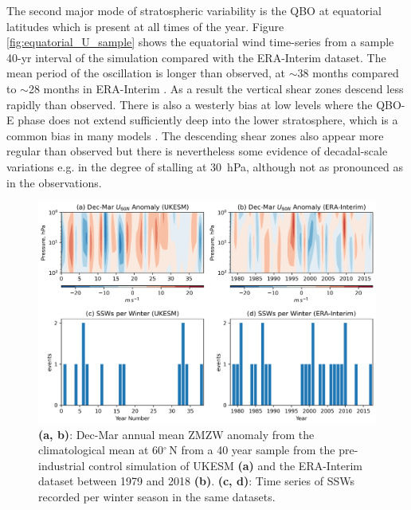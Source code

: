 The second major mode of stratospheric variability is the QBO at equatorial latitudes which is present at all times of the year. Figure \ref{fig:equatorial_U_sample} shows the equatorial wind time-series from a sample 40-yr interval of the simulation compared with the ERA-Interim dataset. The mean period of the oscillation is longer than observed, at $\sim$38 months compared to $\sim$28 months in ERA-Interim \citep{kawataniRepresentation2016}. As a result the vertical shear zones descend less rapidly than observed. There is also a westerly bias at low levels where the QBO-E phase does not extend sufficiently deep into the lower stratosphere, which is a common bias in many models \citep{bushellEvaluation2020}. The descending shear zones also appear more regular than observed but there is nevertheless some evidence of decadal-scale variations e.g. in the degree of stalling at 30\ hPa, although not as pronounced as in the observations.

\begin{figure}[h!]
\begin{center}
\noindent\includegraphics[width = \linewidth]{Figures/Figures-origins/SSW_series_ERA_UKESM.png}
\caption[Vortex ZMZW and SSW time series from ERA-Interim]{\textbf{(a, b)}: Dec-Mar annual mean ZMZW anomaly from the climatological mean at 60$^\circ$\,N from a 40 year sample from the pre-industrial control simulation of UKESM \textbf{(a)} and the ERA-Interim dataset between 1979 and 2018 \textbf{(b)}. \textbf{(c, d)}: Time series of SSWs recorded per winter season in the same datasets.}
\label{fig:SSW_series_sample}
\end{center}
\end{figure}


